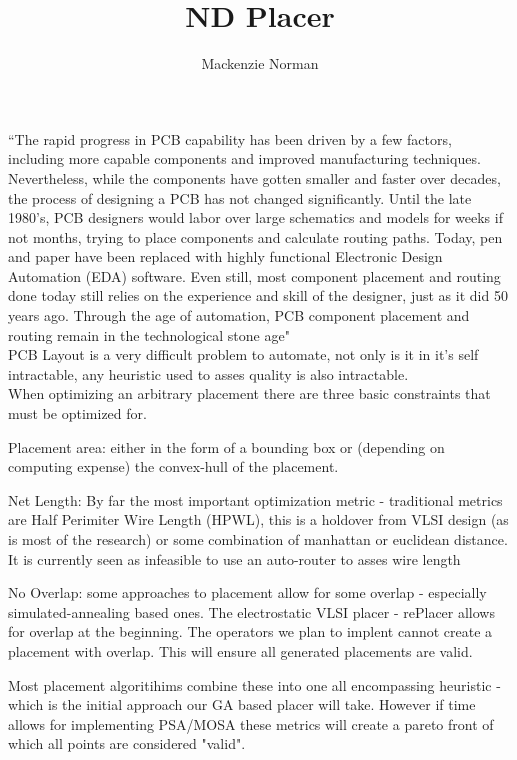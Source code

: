 \documentclass{article}
\title{ND Placer}
\author{Mackenzie Norman}
\begin{document}
\maketitle


``The rapid progress in PCB capability has been driven by a few factors, including more capable components and improved manufacturing techniques. Nevertheless, while the components have gotten smaller and faster over decades, the process of designing a PCB has not changed significantly. Until the late 1980’s, PCB designers would labor over large schematics and models for weeks if not months, trying to place components and calculate routing paths. Today, pen and paper have been replaced with highly functional Electronic Design Automation (EDA) software. Even still, most component placement and routing done today still relies on the experience and skill of the designer, just as it did 50 years ago. Through the age of automation, PCB component placement and routing remain in the technological stone age" \\

PCB Layout is a very difficult problem to automate, not only is it in it's self intractable, any heuristic used to asses quality is also intractable.\\

When optimizing an arbitrary placement there are three basic constraints that must be optimized for.

Placement area: either in the form of a bounding box or (depending on computing expense) the convex-hull of the placement. 

Net Length: By far the most important optimization metric - traditional metrics are Half Perimiter Wire Length (HPWL), this is a holdover from VLSI design (as is most of the research) or some combination of manhattan or euclidean distance. It is currently seen as infeasible to use an auto-router to asses wire length

No Overlap: some approaches to placement allow for some overlap - especially simulated-annealing based ones. The electrostatic VLSI placer - rePlacer allows for overlap at the beginning. The operators we plan to implent cannot create a placement with overlap. This will ensure all generated placements are valid. 

Most placement algoritihims combine these into one all encompassing heuristic - which is the initial approach our GA based placer will take. However if time allows for implementing PSA/MOSA these metrics will create a pareto front of which all points are considered "valid". 
\end{document}
